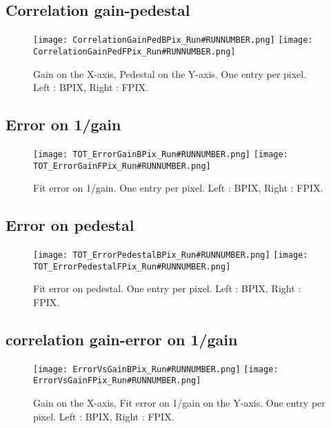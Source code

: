 \documentclass[a4paper,10pt]{article}
\begin{document}
\subsection{Correlation gain-pedestal}

\begin{figure}[ht]
 \centering
\subfigure
 {\texttt{[image: CorrelationGainPedBPix\_Run\#RUNNUMBER.png]}}
\subfigure
 {\texttt{[image: CorrelationGainPedFPix\_Run\#RUNNUMBER.png]}}
\caption{Gain on the X-axis, Pedestal on the Y-axis. One entry per pixel. Left : BPIX, Right : FPIX.}
\end{figure}



\subsection{Error on 1/gain}

\begin{figure}[htc]
 \centering
\subfigure
 {\texttt{[image: TOT\_ErrorGainBPix\_Run\#RUNNUMBER.png]}}
\subfigure
 {\texttt{[image: TOT\_ErrorGainFPix\_Run\#RUNNUMBER.png]}}
\caption{Fit error on 1/gain. One entry per pixel. Left : BPIX, Right : FPIX.}
\end{figure}
\clearpage



\subsection{Error on pedestal}

\begin{figure}[htp]
 \centering
\subfigure
 {\texttt{[image: TOT\_ErrorPedestalBPix\_Run\#RUNNUMBER.png]}}
\subfigure
 {\texttt{[image: TOT\_ErrorPedestalFPix\_Run\#RUNNUMBER.png]}}
\caption{Fit error on pedestal. One entry per pixel. Left : BPIX, Right : FPIX.}
\end{figure}



\subsection{correlation gain-error on 1/gain}

\begin{figure}[htp]
 \centering
\subfigure
 {\texttt{[image: ErrorVsGainBPix\_Run\#RUNNUMBER.png]}}
\subfigure
 {\texttt{[image: ErrorVsGainFPix\_Run\#RUNNUMBER.png]}}
\caption{Gain on the X-axis, Fit error on 1/gain on the Y-axis. One entry per pixel. Left : BPIX, Right : FPIX.}
\end{figure}
\clearpage
\end{document}
